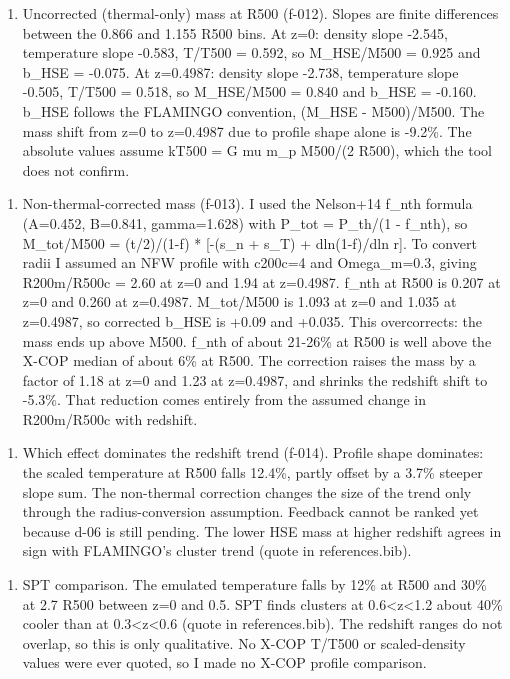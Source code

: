 \documentclass[11pt,a4paper]{article}
\begin{document}
\begin{enumerate}
  \item Uncorrected (thermal-only) mass at R500 (f-012). Slopes are finite differences between the 0.866 and 1.155 R500 bins. At z=0: density slope -2.545, temperature slope -0.583, T/T500 = 0.592, so M\_HSE/M500 = 0.925 and b\_HSE = -0.075. At z=0.4987: density slope -2.738, temperature slope -0.505, T/T500 = 0.518, so M\_HSE/M500 = 0.840 and b\_HSE = -0.160. b\_HSE follows the FLAMINGO convention, (M\_HSE - M500)/M500. The mass shift from z=0 to z=0.4987 due to profile shape alone is -9.2\%. The absolute values assume kT500 = G mu m\_p M500/(2 R500), which the tool does not confirm.
\end{enumerate}
\begin{enumerate}
  \item Non-thermal-corrected mass (f-013). I used the Nelson+14 f\_nth formula (A=0.452, B=0.841, gamma=1.628) with P\_tot = P\_th/(1 - f\_nth), so M\_tot/M500 = (t/2)/(1-f) * [-(s\_n + s\_T) + dln(1-f)/dln r]. To convert radii I assumed an NFW profile with c200c=4 and Omega\_m=0.3, giving R200m/R500c = 2.60 at z=0 and 1.94 at z=0.4987. f\_nth at R500 is 0.207 at z=0 and 0.260 at z=0.4987. M\_tot/M500 is 1.093 at z=0 and 1.035 at z=0.4987, so corrected b\_HSE is +0.09 and +0.035. This overcorrects: the mass ends up above M500. f\_nth of about 21-26\% at R500 is well above the X-COP median of about 6\% at R500. The correction raises the mass by a factor of 1.18 at z=0 and 1.23 at z=0.4987, and shrinks the redshift shift to -5.3\%. That reduction comes entirely from the assumed change in R200m/R500c with redshift.
\end{enumerate}
\begin{enumerate}
  \item Which effect dominates the redshift trend (f-014). Profile shape dominates: the scaled temperature at R500 falls 12.4\%, partly offset by a 3.7\% steeper slope sum. The non-thermal correction changes the size of the trend only through the radius-conversion assumption. Feedback cannot be ranked yet because d-06 is still pending. The lower HSE mass at higher redshift agrees in sign with FLAMINGO's cluster trend (quote in references.bib).
\end{enumerate}
\begin{enumerate}
  \item SPT comparison. The emulated temperature falls by 12\% at R500 and 30\% at 2.7 R500 between z=0 and 0.5. SPT finds clusters at 0.6\textless{}z\textless{}1.2 about 40\% cooler than at 0.3\textless{}z\textless{}0.6 (quote in references.bib). The redshift ranges do not overlap, so this is only qualitative. No X-COP T/T500 or scaled-density values were ever quoted, so I made no X-COP profile comparison.
\end{enumerate}
\end{document}
